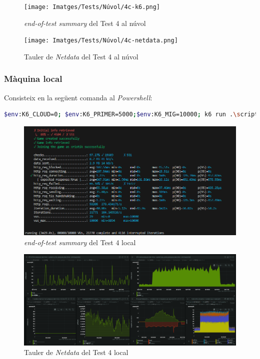 \begin{figure}[!htbp]
    \texttt{[image: Imatges/Tests/Núvol/4c-k6.png]}  
    \caption{\textit{end-of-test summary} del Test 4 al núvol}
\end{figure}

\begin{figure}[!htbp]
    \texttt{[image: Imatges/Tests/Núvol/4c-netdata.png]}  
    \caption{Tauler de \textit{Netdata} del Test 4 al núvol}
\end{figure}

\subsubsection{Màquina local}
Consisteix en la següent comanda al \textit{Powershell}:
\begin{lstlisting}[language=bash, caption=Test 4 local]
    $env:K6_CLOUD=0; $env:K6_PRIMER=5000;$env:K6_MIG=10000; k6 run .\script.js
\end{lstlisting}

\begin{figure}[!htbp]
    \includegraphics[width=1\textwidth]{Imatges/Tests/Local/4l-k6.png}  
    \caption{\textit{end-of-test summary} del Test 4 local}
\end{figure}

\begin{figure}[!htbp]
    \includegraphics[width=1\textwidth]{Imatges/Tests/Local/4l-netdata.png}  
    \caption{Tauler de \textit{Netdata} del Test 4 local}
\end{figure}

